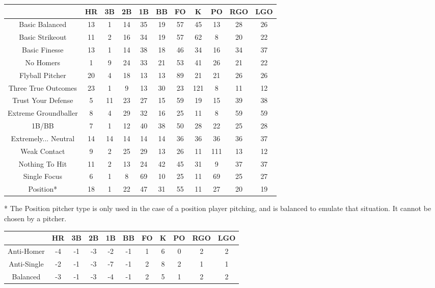 \begin{center}
    \begin{tabular}{|c|c|c|c|c|c|c|c|c|c|c|}
		\hline
        & HR & 3B & 2B & 1B & BB & FO & K   & PO & RGO & LGO    \\
        \hline
Basic Balanced & 13 & 1 & 14 & 35 & 19 & 57 & 45 & 13 & 28 & 26 \\
\hline
Basic Strikeout & 11 & 2 & 16 & 34 & 19 & 57 & 62 & 8 & 20 & 22 \\
\hline
Basic Finesse & 13 & 1 & 14 & 38 & 18 & 46 & 34 & 16 & 34 & 37 \\
\hline
No Homers & 1 & 9 & 24 & 33 & 21 & 53 & 41 & 26 & 21 & 22 \\
\hline
Flyball Pitcher & 20 & 4 & 18 & 13 & 13 & 89 & 21 & 21 & 26 & 26 \\
\hline
Three True Outcomes & 23 & 1 & 9 & 13 & 30 & 23 & 121 & 8 & 11 & 12 \\
\hline
Trust Your Defense & 5 & 11 & 23 & 27 & 15 & 59 & 19 & 15 & 39 & 38 \\
\hline
Extreme Groundballer & 8 & 4 & 29 & 32 & 16 & 25 & 11 & 8 & 59 & 59 \\
\hline
1B/BB & 7 & 1 & 12 & 40 & 38 & 50 & 28 & 22 & 25 & 28 \\
\hline
Extremely... Neutral & 14 & 14 & 14 & 14 & 14 & 36 & 36 & 36 & 36 & 37 \\
\hline
Weak Contact & 9 & 2 & 25 & 29 & 13 & 26 & 11 & 111 & 13 & 12 \\
\hline
Nothing To Hit & 11 & 2 & 13 & 24 & 42 & 45 & 31 & 9 & 37 & 37 \\
\hline
Single Focus & 6 & 1 & 8 & 69 & 10 & 25 & 11 & 69 & 25 & 27 \\
\hline
Position* & 18 & 1 & 22 & 47 & 31 & 55 & 11 & 27 & 20 & 19 \\
\hline
    \end{tabular}
\end{center}

* The Position pitcher type is only used in the case of a position player pitching, 
and is balanced to emulate that situation. It cannot be chosen by a pitcher.

\begin{center}
    \begin{tabular}{|c|c|c|c|c|c|c|c|c|c|c|}
		\hline
        & HR & 3B & 2B & 1B & BB & FO & K   & PO & RGO & LGO    \\
        \hline
        Anti-Homer & -4 & -1 & -3 & -2 & -1 & 1 & 6 & 0 & 2 & 2 \\
        \hline 
        Anti-Single & -2 & -1 & -3 & -7 & -1 & 2 & 8 & 2 & 1 & 1 \\
        \hline
        Balanced & -3 & -1 & -3 & -4 & -1 & 2 & 5 & 1 & 2 & 2 \\
        \hline
    \end{tabular}
\end{center}